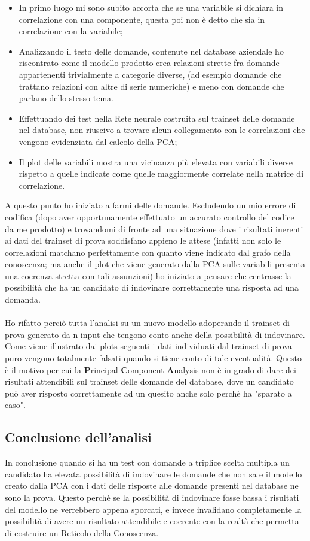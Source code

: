 \begin{itemize}
\item In primo luogo mi sono subito accorta che se una variabile si dichiara in correlazione con una componente, questa poi non \`e detto che sia in correlazione con la variabile;
\item Analizzando il testo delle domande, contenute nel database aziendale ho riscontrato come il modello prodotto crea relazioni strette fra domande appartenenti trivialmente a categorie diverse, (ad esempio domande che trattano relazioni con altre di serie numeriche) e meno con domande che parlano dello stesso tema.
\item Effettuando dei test nella Rete neurale costruita sul trainset delle domande nel database, non riuscivo a trovare alcun collegamento con le correlazioni che vengono evidenziata dal calcolo della PCA;
\item Il plot delle variabili mostra una vicinanza pi\`u elevata con variabili diverse rispetto a quelle indicate come quelle maggiormente correlate nella matrice di correlazione.
\end{itemize}
A questo punto ho iniziato a farmi delle domande. Escludendo un mio errore di codifica (dopo aver opportunamente effettuato un accurato controllo del codice da me prodotto) e trovandomi di fronte ad una situazione dove i risultati inerenti ai dati del trainset di prova soddisfano appieno le attese
(infatti non solo le correlazioni matchano perfettamente con quanto viene indicato dal grafo della conoscenza; ma anche il plot che viene generato dalla PCA sulle variabili presenta una coerenza stretta con tali assunzioni) ho iniziato a pensare che centrasse la possibilit\`a che ha un candidato di indovinare correttamente una risposta ad una domanda.\\\\
Ho rifatto perci\`o tutta l'analisi su un nuovo modello adoperando il trainset di prova generato da n input che tengono conto anche della possibilit\`a di indovinare. Come viene illustrato dai plots seguenti i dati individuati dal trainset di prova puro vengono totalmente falsati quando si tiene conto di tale eventualit\`a. Questo \`e il motivo per cui la \textbf{P}rincipal \textbf{C}omponent \textbf{A}nalysis non \`e in grado di dare dei risultati attendibili sul trainset delle domande del database, dove un candidato pu\`o aver risposto correttamente ad un quesito anche solo perch\`e ha "sparato a caso".

\subsection{Conclusione dell'analisi}
\label{Conclusione dell'analisi}
In conclusione quando si ha un test con domande a triplice scelta multipla un candidato ha elevata possibilit\`a di indovinare le domande che non sa e il modello creato dalla PCA con i dati delle risposte alle domande presenti nel database ne sono la prova. Questo perch\`e se la possibilit\`a di indovinare fosse bassa i risultati del modello ne verrebbero appena sporcati,  e invece invalidano completamente la possibilit\`a di avere un risultato attendibile e coerente con la realt\`a che permetta di costruire un Reticolo della Conoscenza.


